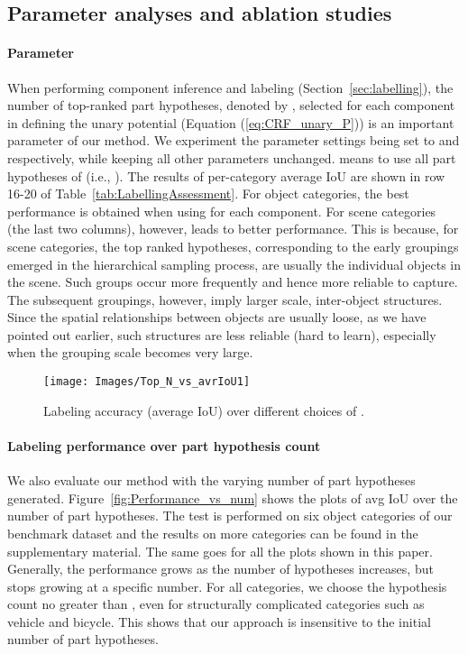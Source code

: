 \documentclass[acmtog]{acmart}
\newcommand{\kx}[1]{{\color{black}#1}}
\newcommand{\new}[1]{{\color{black}#1}}
\begin{document}
\subsection{Parameter analyses and ablation studies}
\label{subsec:param}


\paragraph{\textbf{Parameter }}
When performing component inference and labeling (Section~\ref{sec:labelling}),
the number of top-ranked part hypotheses, denoted by , selected for each component  in defining
the unary potential (Equation (\ref{eq:CRF_unary_P}))
is an important parameter of our method.
We experiment the parameter settings  being set to  and  respectively,
while keeping all other parameters unchanged.
 means to use all part hypotheses of  (i.e., ).
The results of per-category average IoU are shown in row 16-20 of Table~\ref{tab:LabellingAssessment}.
For object categories, the best performance is obtained when using  for each component.
For scene categories (the last two columns), however,  leads to better performance.
This is because, for scene categories, the top ranked hypotheses, corresponding to the early groupings
emerged in the hierarchical sampling process, are usually the individual objects in the scene.
Such groups occur more frequently and hence more reliable to capture.
The subsequent groupings, however, imply larger scale, inter-object structures.
Since the spatial relationships between objects are usually loose, as we have pointed out earlier,
such structures are less reliable (hard to learn), especially when the grouping scale becomes very large.

\begin{figure}[!ht]
  \centering
  \texttt{[image: Images/Top\_N\_vs\_avrIoU1]}
  \caption{Labeling accuracy (average IoU) over different choices of .}
  \label{fig:PerfVsPara}
\end{figure}
\fi

\new{
\paragraph{\textbf{Labeling performance over part hypothesis count}}
We also evaluate our method with the varying number of part hypotheses generated.
Figure~\ref{fig:Performance_vs_num} shows the plots of avg IoU over the number of
part hypotheses.
\kx{The test is performed on six object categories of our benchmark dataset and
the results on more categories can be found in the supplementary material.
The same goes for all the plots shown in this paper.}
Generally, the performance grows as the number of hypotheses increases,
but stops growing at a specific number.
For all categories, we choose the hypothesis count no greater than ,
even for structurally complicated categories such as vehicle and bicycle.
This shows that
our approach is insensitive to the initial number of part hypotheses.}
\end{document}
